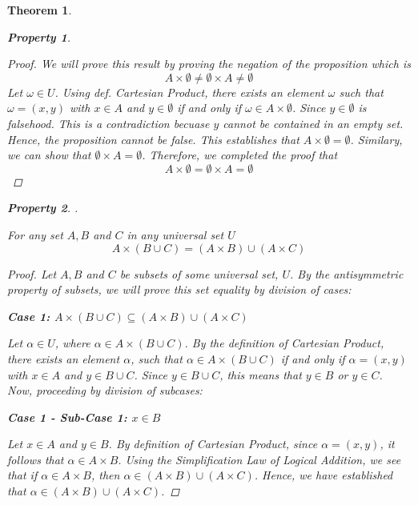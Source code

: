 \documentclass{book}
\newtheorem{theorem}{Theorem}[section]
\newtheorem{property}{Property}[theorem]
\theoremstyle{definition}
\theoremstyle{remark}
\begin{document}
\begin{theorem}
\begin{property}
        \begin{proof}
            We will prove this result by proving the negation of the proposition which is $$ A \times \emptyset \neq \emptyset \times A \neq \emptyset $$
            Let $\omega \in U$. Using def. Cartesian Product, there exists an element $\omega$ such that $\omega = (x,y)$ with $x \in A$ and $y \in \emptyset$ if and only if $\omega \in A \times \emptyset$. Since $y \in \emptyset$ is falsehood. This is a contradiction becuase $y$ cannot be contained in an empty set. Hence, the proposition cannot be false. This establishes that $A \times \emptyset = \emptyset$. Similary, we can show that $\emptyset \times A = \emptyset$. Therefore, we completed the proof that $$ A \times \emptyset = \emptyset \times A = \emptyset $$
            
        \end{proof}
    \end{property}
    
    
    
    
    \newpage
    \begin{property}
    . \\
        \begin{tcolorbox}
            For any set $A, B$ and $C$ in any universal set $U$
                \begin{equation*}
                    A \times (B \cup C) = (A \times B) \cup (A \times C)
                \end{equation*}
        \end{tcolorbox}
    
        \begin{proof}
            Let $A, B$ and $C$ be subsets of some universal set, $U$. By the antisymmetric property of subsets, we will prove this set equality by division of cases: \\
            
            \begin{flushleft} \textbf{Case 1: $A \times (B \cup C) \subseteq (A \times B) \cup (A \times C)$} \end{flushleft}
                Let $\alpha \in U$, where $\alpha \in A \times (B \cup C)$. By the definition of Cartesian Product, there exists an element $\alpha$, such that $\alpha \in A \times (B \cup C)$ if and only if $\alpha = (x,y)$ with $x \in A$ and $y \in B \cup C$. Since $y \in B \cup C$, this means that $y \in B$ or $y \in C$. Now, proceeding by division of subcases:
    
                
                    \begin{flushleft} \textbf{Case 1 - Sub-Case 1: $x \in B$} \end{flushleft}
                        Let $x \in A$ and $y \in B$. By definition of Cartesian Product, since $\alpha = (x,y)$, it follows that $\alpha \in A \times B$. Using the Simplification Law of Logical Addition, we see that if $\alpha \in A \times B$, then $\alpha \in (A \times B) 
                        \cup (A \times C)$. Hence, we have established that $\alpha \in (A \times B) 
                        \cup (A \times C)$.  
                    

\end{proof}
\end{property}
\end{theorem}
\end{document}
